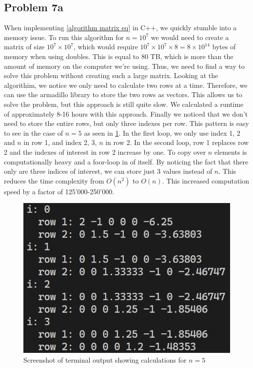 \documentclass[english,notitlepage]{revtex4-1}  %
\begin{document}
\subsection*{Problem 7a}
When implementing \cref{algorithm matrix eq} in C++, we quickly stumble into a memory issue. To run this algorithm for $n=10^7$ we would need to create a matrix of size $10^7 \times 10^7$, which would require $10^7 \times 10^7 \times 8 = 8 × 10^{14}$ bytes of memory when using doubles. This is equal to 80 TB, which is more than the amount of memory on the computer we're using. Thus, we need to find a way to solve this problem without creating such a large matrix. Looking at the algorithim, we notice we only need to calculate two rows at a time. Therefore, we can use the armadillo library to store the two rows as vectors. This allows us to solve the problem, but this approach is still quite slow. We calculated a runtime of approximately 8-16 hours with this approach. Finally we noticed that we don't need to store the entire rows, but only three indexes per row. This pattern is easy to see in the case of $n=5$ as seen in \cref{fig: vector_example}. In the first loop, we only use index 1, 2 and $n$ in row 1, and index 2, 3, $n$ in row 2. In the second loop, row 1 replaces row 2 and the indexes of interest in row 2 increase by one. To copy over $n$ elements is computationally heavy and a foor-loop in of itself. By noticing the fact that there only are three indices of interest, we can store just 3 values instead of $n$. This reduces the time complexity from $O(n^2)$ to $O(n)$. This increased computation speed by a factor of 125'000-250'000.  

\begin{figure}
    \centering
    \includegraphics[scale=0.5]{vector_example.png}
    \caption{Screenshot of terminal output showing calculations for $n = 5$}
    \label{fig: vector_example}
\end{figure}
\end{document}

